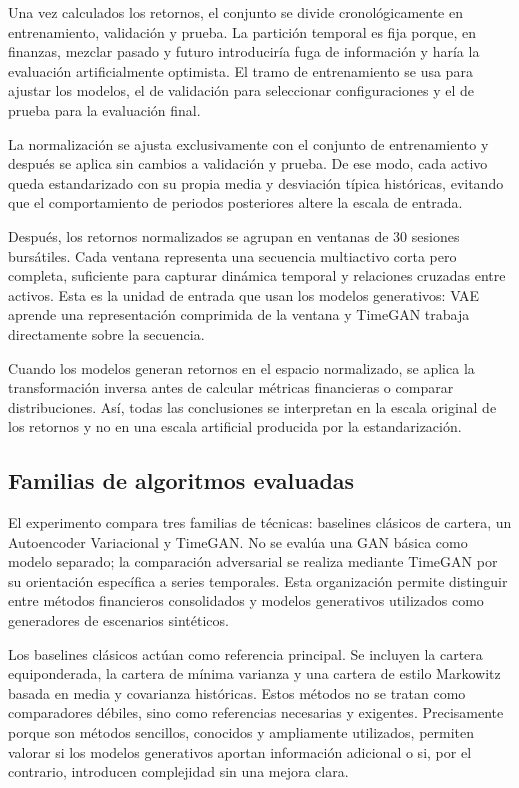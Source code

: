 \documentclass[11pt,a4paper,spanish,oneside]{book}
\numberwithin{equation}{chapter}
\numberwithin{figure}{chapter}
\begin{document}
Una vez calculados los retornos, el conjunto se divide cronológicamente en entrenamiento, validación y prueba. La partición temporal es fija porque, en finanzas, mezclar pasado y futuro introduciría fuga de información y haría la evaluación artificialmente optimista. El tramo de entrenamiento se usa para ajustar los modelos, el de validación para seleccionar configuraciones y el de prueba para la evaluación final.

La normalización se ajusta exclusivamente con el conjunto de entrenamiento y después se aplica sin cambios a validación y prueba. De ese modo, cada activo queda estandarizado con su propia media y desviación típica históricas, evitando que el comportamiento de periodos posteriores altere la escala de entrada.

Después, los retornos normalizados se agrupan en ventanas de 30 sesiones bursátiles. Cada ventana representa una secuencia multiactivo corta pero completa, suficiente para capturar dinámica temporal y relaciones cruzadas entre activos. Esta es la unidad de entrada que usan los modelos generativos: VAE aprende una representación comprimida de la ventana y TimeGAN trabaja directamente sobre la secuencia.

Cuando los modelos generan retornos en el espacio normalizado, se aplica la transformación inversa antes de calcular métricas financieras o comparar distribuciones. Así, todas las conclusiones se interpretan en la escala original de los retornos y no en una escala artificial producida por la estandarización.

\subsection{Familias de algoritmos evaluadas}

El experimento compara tres familias de técnicas: baselines clásicos de cartera, un Autoencoder Variacional y TimeGAN. No se evalúa una GAN básica como modelo separado; la comparación adversarial se realiza mediante TimeGAN por su orientación específica a series temporales. Esta organización permite distinguir entre métodos financieros consolidados y modelos generativos utilizados como generadores de escenarios sintéticos.

Los baselines clásicos actúan como referencia principal. Se incluyen la cartera equiponderada, la cartera de mínima varianza y una cartera de estilo Markowitz basada en media y covarianza históricas. Estos métodos no se tratan como comparadores débiles, sino como referencias necesarias y exigentes. Precisamente porque son métodos sencillos, conocidos y ampliamente utilizados, permiten valorar si los modelos generativos aportan información adicional o si, por el contrario, introducen complejidad sin una mejora clara.
\end{document}
